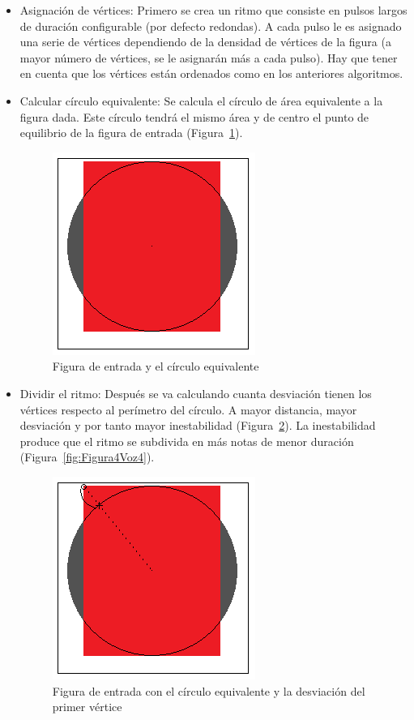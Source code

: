 \begin{itemize}
	\item Asignación de vértices: Primero se crea un ritmo que consiste en pulsos largos de duración configurable (por defecto redondas). A cada pulso le es asignado una serie de vértices dependiendo de la densidad de vértices de la figura (a mayor número de vértices, se le asignarán más a cada pulso). Hay que tener en cuenta que los vértices están ordenados como en los anteriores algoritmos.

	\item Calcular círculo equivalente: Se calcula el círculo de área equivalente a la figura dada. Este círculo tendrá el mismo área y de centro el punto de equilibrio de la figura de entrada (Figura~\ref{fig:Figura2Voz4}).
		
		\begin{figure}[!htbp]
		\centering
		\hspace*{0.0in}
		\includegraphics[scale=1]{graphics/simpletest2-Circulo.png}
		\caption{Figura de entrada y el círculo equivalente}
		\label{fig:Figura2Voz4}
		\end{figure}

	\item Dividir el ritmo: Después se va calculando cuanta desviación tienen los vértices respecto al perímetro del círculo. A mayor distancia, mayor desviación y por tanto mayor inestabilidad (Figura~\ref{fig:Figura3Voz4}). La inestabilidad produce que el ritmo se subdivida en más notas de menor duración (Figura~\ref{fig:Figura4Voz4}).

		\begin{figure}[!htbp]
		\centering
		\hspace*{0.0in}
		\includegraphics[scale=1]{graphics/simpletest2-Circulo_2.png}
		\caption{Figura de entrada con el círculo equivalente y la desviación del primer vértice}
		\label{fig:Figura3Voz4}
		\end{figure}


\end{itemize}
